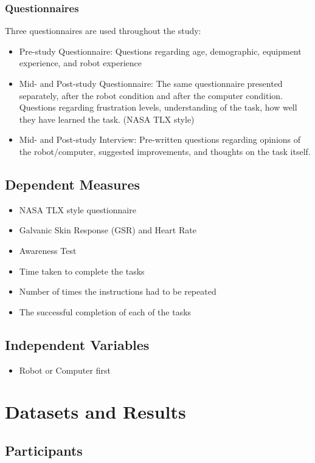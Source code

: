 \documentclass[conference]{IEEEtran}
\begin{document}
\subsubsection{Questionnaires}
Three questionnaires are used throughout the study:
\begin{itemize}
    \item Pre-study Questionnaire: Questions regarding age, demographic, equipment experience, and robot experience
    \item Mid- and Post-study Questionnaire: The same questionnaire presented separately, after the robot condition and after the computer condition. Questions regarding frustration levels, understanding of the task, how well they have learned the task. (NASA TLX style)
    \item Mid- and Post-study Interview: Pre-written questions regarding opinions of the robot/computer, suggested improvements, and thoughts on the task itself.
\end{itemize}

\subsection{Dependent Measures}
\begin{itemize}
    \item NASA TLX style questionnaire \cite{hart1988development}
    \item Galvanic Skin Response (GSR) and Heart Rate
    \item Awareness Test
    \item Time taken to complete the tasks
    \item Number of times the instructions had to be repeated
    \item The successful completion of each of the tasks
\end{itemize}
\subsection{Independent Variables}
\begin{itemize}
    \item Robot or Computer first
\end{itemize}

\section{Datasets and Results}

\subsection{Participants}
\end{document}

